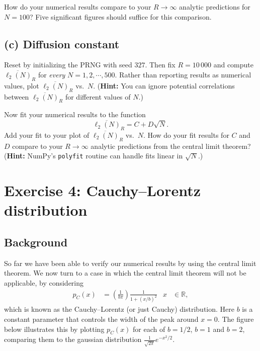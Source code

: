 \documentclass[12 pt]{article} %
\newcommand{\Rbb}{\ensuremath{\mathbb R} }
\newcommand{\showmarks}[1]{\rightline{\texttt{[#1 marks]}}} %
\begin{document}
How do your numerical results compare to your $R \to \infty$ analytic predictions for $N = 100$?
Five significant figures should suffice for this comparison.

\showmarks{8}

\subsection*{(c) Diffusion constant}
Reset by initializing the PRNG with seed $327$.
Then fix $R = 10\,000$ and compute $\overline{\ell_2(N)}_R$ for \textit{every} $N = 1, 2, \cdots, 500$.
Rather than reporting results as numerical values, plot $\overline{\ell_2(N)}_R$ vs.\ $N$.
(\textbf{Hint:} You can ignore potential correlations between $\overline{\ell_2(N)}_R$ for different values of $N$.)

\showmarks{6}

Now fit your numerical results to the function
\begin{equation*}
  \overline{\ell_2(N)}_R = C + D \sqrt{N}.
\end{equation*}
Add your fit to your plot of $\overline{\ell_2(N)}_R$ vs.\ $N$.
How do your fit results for $C$ and $D$ compare to your $R \to \infty$ analytic predictions from the central limit theorem?
(\textbf{Hint:} NumPy's \texttt{polyfit} routine can handle fits linear in $\sqrt{N}$.)

\showmarks{4}



\newpage %
\section*{Exercise 4: Cauchy--Lorentz distribution}
\subsection*{Background}
So far we have been able to verify our numerical results by using the central limit theorem.
We now turn to a case in which the central limit theorem will not be applicable, by considering
\begin{align}
  \label{eq:cauchy}
  p_C(x) & = \left(\frac{1}{b \pi}\right) \frac{1}{1 + (x / b)^2} &
  x & \in \Rbb,
\end{align}
which is known as the Cauchy--Lorentz (or just Cauchy) distribution.
Here $b$ is a constant parameter that controls the width of the peak around $x = 0$.
The figure below illustrates this by plotting $p_C(x)$ for each of $b = 1 / 2$, $b = 1$ and $b = 2$, comparing them to the gaussian distribution $\displaystyle \frac{1}{\sqrt{2\pi}} e^{-x^2 / 2}$.
\end{document}
